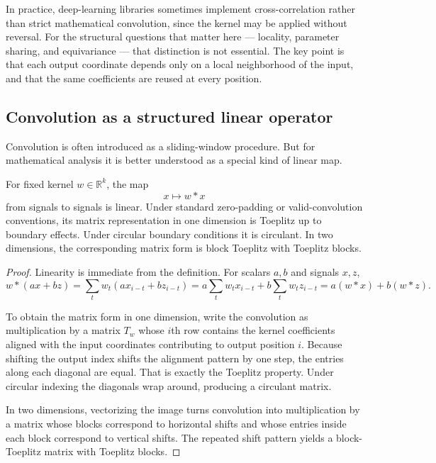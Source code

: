 \medskip

In practice, deep-learning libraries sometimes implement cross-correlation rather than strict mathematical convolution, since the kernel may be applied without reversal.
For the structural questions that matter here --- locality, parameter sharing, and equivariance --- that distinction is not essential.
The key point is that each output coordinate depends only on a local neighborhood of the input, and that the same coefficients are reused at every position.

\subsection*{Convolution as a structured linear operator}

Convolution is often introduced as a sliding-window procedure.
But for mathematical analysis it is better understood as a special kind of linear map.

\begin{proposition}
For fixed kernel $w \in \mathbb{R}^k$, the map
\[
 x \longmapsto w * x
\]
from signals to signals is linear.
Under standard zero-padding or valid-convolution conventions, its matrix representation in one dimension is Toeplitz up to boundary effects.
Under circular boundary conditions it is circulant.
In two dimensions, the corresponding matrix form is block Toeplitz with Toeplitz blocks.
\end{proposition}

\begin{proof}
Linearity is immediate from the definition.
For scalars $a,b$ and signals $x,z$,
\[
 w*(ax+bz)
 = \sum_t w_t(ax_{i-t}+bz_{i-t})
 = a\sum_t w_t x_{i-t} + b\sum_t w_t z_{i-t}
 = a(w*x)+b(w*z).
\]

To obtain the matrix form in one dimension, write the convolution as multiplication by a matrix $T_w$ whose $i$th row contains the kernel coefficients aligned with the input coordinates contributing to output position $i$.
Because shifting the output index shifts the alignment pattern by one step, the entries along each diagonal are equal.
That is exactly the Toeplitz property.
Under circular indexing the diagonals wrap around, producing a circulant matrix.

In two dimensions, vectorizing the image turns convolution into multiplication by a matrix whose blocks correspond to horizontal shifts and whose entries inside each block correspond to vertical shifts.
The repeated shift pattern yields a block-Toeplitz matrix with Toeplitz blocks.
\end{proof}

